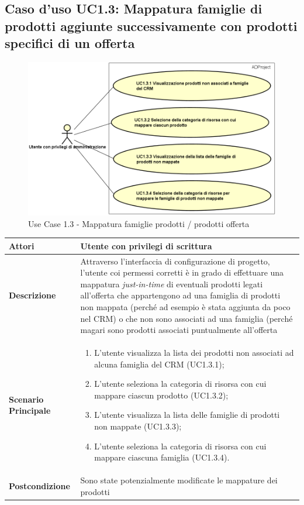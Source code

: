 	\hypertarget{UC1.3}{}
	\subsection{Caso d'uso UC1.3: Mappatura famiglie di prodotti aggiunte successivamente con prodotti specifici di un offerta}
	\begin{figure}[H]
		\centering
		\includegraphics[scale=0.6]{images/useCase/UC1_3}
		\caption{Use Case 1.3 - Mappatura famiglie prodotti / prodotti offerta}
		\label{fig:uc1.3}
	\end{figure}
	\begin{longtable}{ | p{2.7cm} | p{12cm} |}
		\hline \textbf{Attori} & Utente con privilegi di scrittura\\ 
		\hline \textbf{Descrizione} & Attraverso l’interfaccia di configurazione di progetto, l’utente coi permessi corretti è in grado di effettuare una mappatura \textit{just-in-time} di eventuali prodotti legati all’offerta che appartengono ad una famiglia di prodotti non mappata (perché ad esempio è stata aggiunta da poco nel CRM) o che non sono associati ad una famiglia (perché magari sono prodotti associati puntualmente all’offerta\\ 
		\hline \textbf{Scenario Principale} & \begin{enumerate}
			\itemsep-0.5em 
			\item L’utente visualizza la lista dei prodotti non associati ad alcuna famiglia del CRM  (UC1.3.1);
			\item L’utente seleziona la categoria di risorsa con cui mappare ciascun prodotto  (UC1.3.2);
			\item L’utente visualizza la lista delle famiglie di prodotti non mappate  (UC1.3.3);
			\item L’utente seleziona la categoria di risorsa con cui mappare ciascuna famiglia  (UC1.3.4).
			
		\end{enumerate}
		\\ 
		\hline \textbf{Postcondizione} & Sono state potenzialmente modificate le mappature dei prodotti\\ 
		\hline 
	\end{longtable}
	
